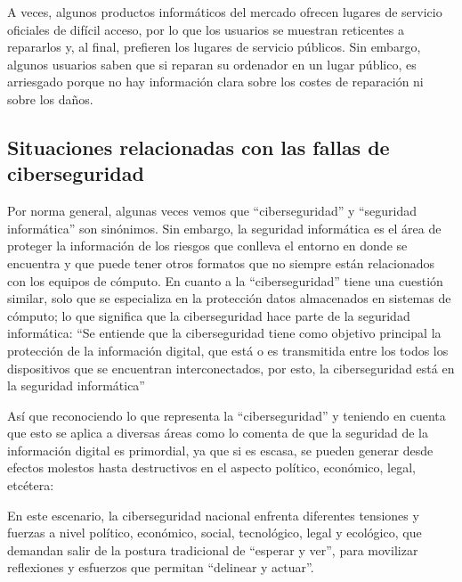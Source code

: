 \begin{displayquote}
  A veces, algunos productos informáticos del mercado ofrecen lugares de
  servicio oficiales de difícil acceso, por lo que los usuarios se muestran
  reticentes a repararlos y, al final, prefieren los lugares de servicio
  públicos. Sin embargo, algunos usuarios saben que si reparan su ordenador en
  un lugar público, es arriesgado porque no hay información clara sobre los
  costes de reparación ni sobre los daños.
\end{displayquote}

\subsection{Situaciones relacionadas con las fallas de ciberseguridad}

Por norma general, algunas veces vemos que ``ciberseguridad'' y ``seguridad
informática'' son sinónimos. Sin embargo, la seguridad informática es el área de
proteger la información de los riesgos que conlleva el entorno en donde se
encuentra y que puede tener otros formatos que no siempre están relacionados
con los equipos de cómputo. En cuanto a la ``ciberseguridad'' tiene una cuestión
similar, solo que se especializa en la protección datos almacenados en sistemas
de cómputo; lo que significa que la ciberseguridad hace parte de la seguridad
informática: ``Se entiende que la ciberseguridad tiene como objetivo
principal la protección de la información digital, que está o es transmitida
entre los todos los dispositivos que se encuentran interconectados, por esto,
la ciberseguridad está en la seguridad informática''
\parencite{Mosquera2019} 

Así que reconociendo lo que representa la ``ciberseguridad'' y teniendo en
cuenta que esto se aplica a diversas áreas como lo comenta
\textcite{CanoMartinez2022} de que la seguridad de la información digital es
primordial, ya que si es escasa, se pueden generar desde efectos molestos hasta
destructivos en el aspecto político, económico, legal, etcétera:

\begin{displayquote}
  En este escenario, la ciberseguridad nacional enfrenta diferentes tensiones y
  fuerzas a nivel político, económico, social, tecnológico, legal y ecológico,
  que demandan salir de la postura tradicional de “esperar y ver”, para
  movilizar reflexiones y esfuerzos que permitan “delinear y actuar”.
\end{displayquote}

